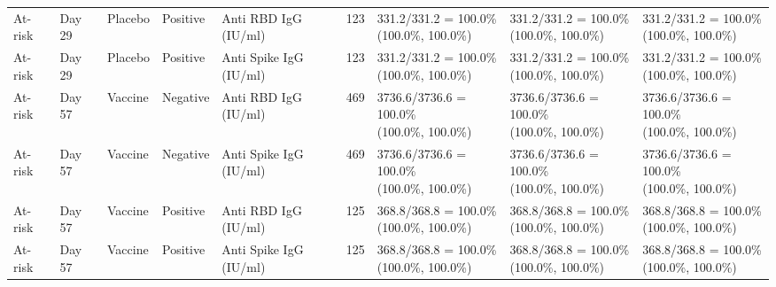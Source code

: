 \documentclass[]{book}
\theoremstyle{definition}
\theoremstyle{definition}
\theoremstyle{definition}
\newcommand{\1}{\mathbbm{1}}
\begin{document}
\begin{landscape}
\begin{ThreePartTable}
\begin{longtable}[t]{>{\raggedright\arraybackslash}p{2.7cm}llllllll}
\hspace{1em}At-risk & Day 29 & Placebo & Positive & Anti RBD IgG (IU/ml) & 123 & \makecell[l]{331.2/331.2 = 100.0\%\\(100.0\%, 100.0\%)} & \makecell[l]{331.2/331.2 = 100.0\%\\(100.0\%, 100.0\%)} & \makecell[l]{331.2/331.2 = 100.0\%\\(100.0\%, 100.0\%)}\\
\hspace{1em}At-risk & Day 29 & Placebo & Positive & Anti Spike IgG (IU/ml) & 123 & \makecell[l]{331.2/331.2 = 100.0\%\\(100.0\%, 100.0\%)} & \makecell[l]{331.2/331.2 = 100.0\%\\(100.0\%, 100.0\%)} & \makecell[l]{331.2/331.2 = 100.0\%\\(100.0\%, 100.0\%)}\\
\hspace{1em}At-risk & Day 57 & Vaccine & Negative & Anti RBD IgG (IU/ml) & 469 & \makecell[l]{3736.6/3736.6 = 100.0\%\\(100.0\%, 100.0\%)} & \makecell[l]{3736.6/3736.6 = 100.0\%\\(100.0\%, 100.0\%)} & \makecell[l]{3736.6/3736.6 = 100.0\%\\(100.0\%, 100.0\%)}\\
\hspace{1em}At-risk & Day 57 & Vaccine & Negative & Anti Spike IgG (IU/ml) & 469 & \makecell[l]{3736.6/3736.6 = 100.0\%\\(100.0\%, 100.0\%)} & \makecell[l]{3736.6/3736.6 = 100.0\%\\(100.0\%, 100.0\%)} & \makecell[l]{3736.6/3736.6 = 100.0\%\\(100.0\%, 100.0\%)}\\
\hspace{1em}At-risk & Day 57 & Vaccine & Positive & Anti RBD IgG (IU/ml) & 125 & \makecell[l]{368.8/368.8 = 100.0\%\\(100.0\%, 100.0\%)} & \makecell[l]{368.8/368.8 = 100.0\%\\(100.0\%, 100.0\%)} & \makecell[l]{368.8/368.8 = 100.0\%\\(100.0\%, 100.0\%)}\\
\hspace{1em}At-risk & Day 57 & Vaccine & Positive & Anti Spike IgG (IU/ml) & 125 & \makecell[l]{368.8/368.8 = 100.0\%\\(100.0\%, 100.0\%)} & \makecell[l]{368.8/368.8 = 100.0\%\\(100.0\%, 100.0\%)} & \makecell[l]{368.8/368.8 = 100.0\%\\(100.0\%, 100.0\%)}\\

\end{longtable}
\end{ThreePartTable}
\end{landscape}
\end{document}
